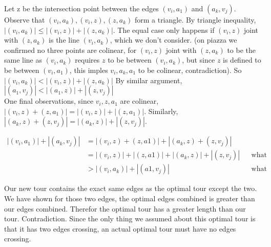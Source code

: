 \documentclass{article}
\begin{document}
    Let z be the intersection point between the edges $(v_i, a_1)$ and $(a_k, v_j)$. 
    Observe that $(v_i, a_k), (v_i, z), (z, a_k)$ form a triangle. 
    By triangle inequality, $|(v_i, a_k)| \leq |(v_i, z)|+|(z, a_k)|$. The equal case only happens 
    if $(v_i, z)$ joint with $(z, a_k)$ is the line $(v_i, a_k)$, which we don’t consider. (on piazza we confirmed 
    no three points are colinear, for $(v_i,z)$ joint with $(z, a_k)$ to be the same line as $(v_i, a_k)$ requires
    $z$ to be between $(v_i, a_k)$, but since $z$ is defined to be between $(v_i, a_1)$, this imples
    $v_i, a_k, a_1$ to be colinear, contradiction). So $|(v_i, a_k)| < |(v_i, z)|+|(z, a_k)|$
    By similar argument, $|(a_1, v_j)| < |(a_1, z)| + |(z, v_j)|$ \\

    One final observations, since $v_i, z, a_1$ are colinear, $|(v_i, z) + (z, a_1)| = |(v_i, z)| + |(z, a_1)|$.
    Similarly, $|(a_k, z) + (z,v_j)| = |(a_k, z)| + |(z, v_j)|$.

    \begin{align*}
        |(v_i, a_1)| + |(a_k, v_j)| & = |(v_i, z) + (z, a1)| + |(a_k, z) + (z, v_j)| \\
        & = |(v_i, z)| + |(z, a1)| + |(a_k, z)| + |(z, v_j)| && \text{what we just proved} \\
        & > |(v_i, a_k)| + |(a1, v_j)| &&\text{what we proved earlier}
    \end{align*}

    Our new tour contains the exact same edges as the optimal tour except the two. 
    We have shown for those two edges, the optimal edges combined is greater than our edges combined. 
    Therefor the optimal tour has a greater length than our tour. Contradiction. 
    Since the only thing we assumed about this optimal tour is that it has two edges crossing,
    an actual optimal tour must have no edges crossing.

    
\end{document}
